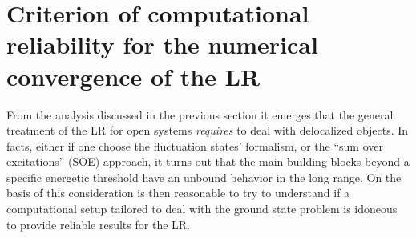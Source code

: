 \documentclass[reprint,aps,prb]{revtex4-1}
\newcommand{\dd}{{\rm d}}
\newcommand{\eps}{\epsilon}
\newcommand{\be}{\begin{equation}}
\newcommand{\ee}{\end{equation}}
\newcommand{\nn}{\notag}
\newcommand{\lb}{\label}
\newcommand{\op}[1]{\hat {#1}}
\newcommand{\commutator}[2]{\left[ {#1} , {#2} \right]}
\newcommand{\trace}[1]{\mathrm{tr}\left(#1\right)}
\newcommand{\dmnot}{\op{\rho}_0}
\begin{document}


\section{Criterion of computational reliability for the numerical convergence of the LR}

From the analysis discussed in the previous section it emerges that the general treatment of the LR for open systems \emph{requires} to deal with delocalized
objects. In facts, either if one choose the fluctuation states' formalism, or the ``sum over excitations'' (SOE) approach, it turns out that the main building blocks
beyond a specific energetic threshold have an unbound behavior in the long range. 
On the basis of this consideration is then reasonable to try to understand if a computational setup tailored to deal with the ground state problem is idoneous to provide
reliable results for the LR. 

\vspace{0.3cm}
\end{document}
